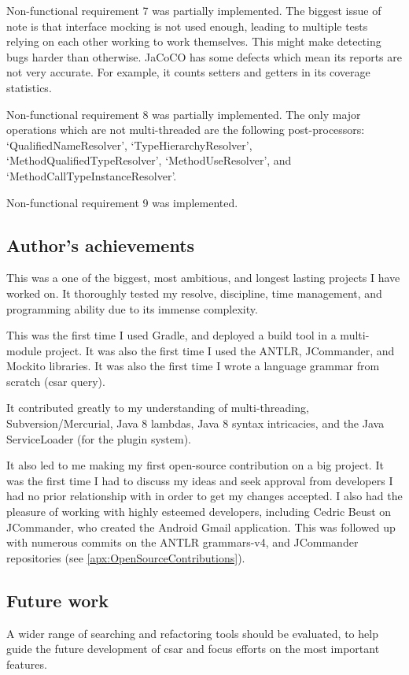 \documentclass[12pt, letterpaper]{article}
\begin{document}
Non-functional requirement 7 was partially implemented.
The biggest issue of note is that interface mocking is not used enough, leading to multiple tests relying on each other working to work themselves.
This might make detecting bugs harder than otherwise.
JaCoCO has some defects which mean its reports are not very accurate.
For example, it counts setters and getters in its coverage statistics.

Non-functional requirement 8 was partially implemented.
The only major operations which are not multi-threaded are the following post-processors: `QualifiedNameResolver', `TypeHierarchyResolver', `MethodQualifiedTypeResolver', `MethodUseResolver', and `MethodCallTypeInstanceResolver'.

Non-functional requirement 9 was implemented.

\subsection{Author's achievements}
This was a one of the biggest, most ambitious, and longest lasting projects I have worked on.
It thoroughly tested my resolve, discipline, time management, and programming ability due to its immense complexity.

This was the first time I used Gradle, and deployed a build tool in a multi-module project.
It was also the first time I used the ANTLR, JCommander, and Mockito libraries.
It was also the first time I wrote a language grammar from scratch (csar query).

It contributed greatly to my understanding of multi-threading, Subversion/Mercurial, Java 8 lambdas, Java 8 syntax intricacies, and the Java ServiceLoader (for the plugin system).

It also led to me making my first open-source contribution on a big project.
It was the first time I had to discuss my ideas and seek approval from developers I had no prior relationship with in order to get my changes accepted.
I also had the pleasure of working with highly esteemed developers, including Cedric Beust on JCommander, who created the Android Gmail application.
This was followed up with numerous commits on the ANTLR grammars-v4, and JCommander repositories (see \ref{apx:OpenSourceContributions}).

\subsection{Future work}
A wider range of searching and refactoring tools should be evaluated, to help guide the future development of csar and focus efforts on the most important features.
\end{document}
